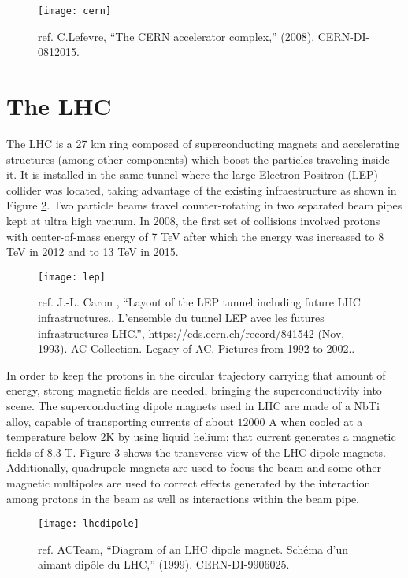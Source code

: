 \begin{figure}[!h]
  \centering
  \texttt{[image: cern]}
  \caption {ref. C.Lefevre, ``The CERN accelerator complex,'' (2008). CERN-DI-0812015.  }\label{cern}
\end{figure}


\section{The LHC}

The LHC is a 27 km ring composed of superconducting magnets and accelerating structures (among other components) which boost the particles traveling inside it. It is installed in the same tunnel where the large Electron-Positron (LEP) collider was located, taking advantage of the existing infraestructure as shown in Figure \ref{lep}. Two particle beams travel counter-rotating in two separated beam pipes kept at ultra high vacuum. In 2008, the first set of collisions involved protons with center-of-mass energy of 7 TeV after which the energy was increased to 8 TeV in 2012 and to 13 TeV in 2015. 

\begin{figure}[!h]
\centering
\texttt{[image: lep]}
\caption {ref. J.-L. Caron , ``Layout of the LEP tunnel including future LHC infrastructures.. L'ensemble du tunnel LEP avec les futures infrastructures LHC.'',  https://cds.cern.ch/record/841542  (Nov, 1993). AC Collection. Legacy of AC. Pictures from 1992 to 2002.. }\label{lep}
\end{figure}

In order to keep the protons in the circular trajectory carrying that amount of energy, strong magnetic fields are needed, bringing the superconductivity into scene. The superconducting dipole magnets used in LHC are made of a NbTi alloy, capable of transporting currents of about $12000$ A when cooled at a temperature below 2K by using liquid helium; that current generates a magnetic fields of 8.3 T. Figure \ref{lhcdipole} shows the transverse view of the LHC dipole magnets. Additionally, quadrupole magnets are used to focus the beam and some other magnetic multipoles are used to correct effects generated by the interaction among protons in the beam as well as interactions within the beam pipe.

\begin{figure}[!h]
\centering
\texttt{[image: lhcdipole]}
\caption {ref. ACTeam, ``Diagram of an LHC dipole magnet. Sch\'ema d'un aimant dip\^ole du LHC,'' (1999). CERN-DI-9906025. }\label{lhcdipole}
\end{figure}

